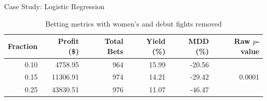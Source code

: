 \documentclass[final]{beamer}
\newlength{\colwidth}
\begin{document}
\begin{frame}[t]
\begin{columns}[t]
\begin{column}{\colwidth}
\begin{block}{Case Study: Logistic Regression}
        \scriptsize
        \begin{table}[!htb]
        \centering
        \begin{tabular}{rrrrrr} 
        \toprule
        Fraction & Profit (\$) & Total Bets & Yield (\%) & MDD (\%) & Raw $p$-value            \\ 
        \midrule
        0.10     & 4758.95     & 964        & 15.99      & -20.56   & \multirow{3}{*}{0.0001}  \\
        0.15     & 11306.91    & 974        & 14.21      & -29.42   &                          \\
        0.25     & 43830.51    & 976        & 11.07      & -46.47   &                          \\
        \bottomrule
        \end{tabular}
        \normalsize
        \caption{Betting metrics with women's and debut fights removed}
        \end{table}
  

\end{block}
\end{column}
\end{columns}
\end{frame}
\end{document}
